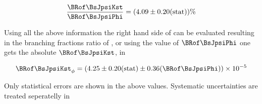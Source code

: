 \begin{equation}
\frac{\BRof\BsJpsiKst}{\BRof\BsJpsiPhi} = (4.09 \pm 0.20 ({\rm stat}) )\% \\
\label{norm_jpsiPhi_result}
\end{equation}

\noindent Using all the above information the right hand side of  can be evaluated resulting in 
the branching fractions ratio of , or using the value of $\BRof\BsJpsiPhi$ 
one gets the absolute $\BRof\BsJpsiKst$, in 

\begin{equation}
\label{Br_JpsiPhi}
\BRof\BsJpsiKst_{\phi} = (4.25 \pm 0.20  \text{(stat)} \pm 0.36 (\BRof\BsJpsiPhi))\times 10^{-5}
\end{equation}

\noindent Only statistical errors are shown in the above values. Systematic uncertainties are treated seperatelly in 


